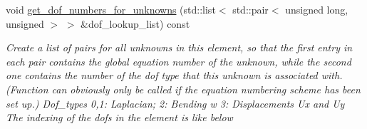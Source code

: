 \begin{DoxyCompactItemize}
void \hyperlink{classoomph_1_1TDisplacementBasedFoepplvonKarmanElement_ad029c2562317f83814272ad57d8f7582}{get\+\_\+dof\+\_\+numbers\+\_\+for\+\_\+unknowns} (std\+::list$<$ std\+::pair$<$ unsigned long, unsigned $>$ $>$ \&dof\+\_\+lookup\+\_\+list) const
\begin{DoxyCompactList}\small\item\em Create a list of pairs for all unknowns in this element, so that the first entry in each pair contains the global equation number of the unknown, while the second one contains the number of the dof type that this unknown is associated with. (Function can obviously only be called if the equation numbering scheme has been set up.) Dof\+\_\+types 0,1\+: Laplacian; 2\+: Bending w 3\+: Displacements Ux and Uy The indexing of the dofs in the element is like below


\end{DoxyCompactList}
\end{DoxyCompactItemize}
